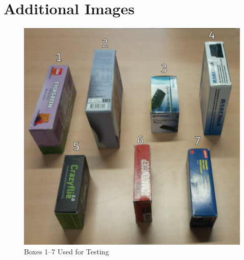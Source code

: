 \documentclass[letterpaper, 10 pt, conference]{conf/ieeeconf}  %
\begin{document}
\appendix
\section*{Additional Images}
\begin{figure}[H]
  \centering
  \includegraphics[width=0.9\linewidth]{test_boxes.png}
  \caption{\label{fig:test_boxes} Boxes 1--7 Used for Testing}
\end{figure}
\end{document}
